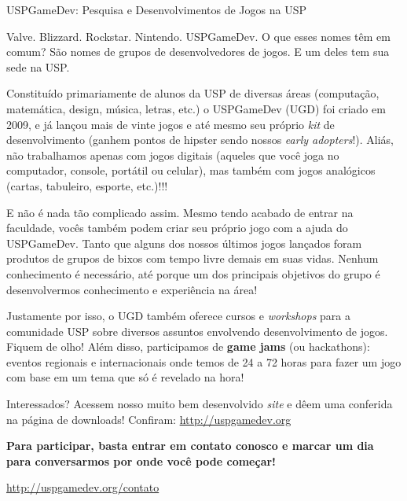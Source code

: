 \begin{subsecao}{USPGameDev: Pesquisa e Desenvolvimentos de Jogos na USP}


Valve. Blizzard. Rockstar. Nintendo. USPGameDev. O que esses nomes têm em comum?
São nomes de grupos de desenvolvedores de jogos. E um deles tem sua sede na USP.

Constituído primariamente de alunos da USP de diversas áreas (computação,
matemática, design, música, letras, etc.) o USPGameDev (UGD) foi criado em 2009,
e já lançou mais de vinte jogos e até mesmo seu próprio \textit{kit} de
desenvolvimento (ganhem pontos de hipster sendo nossos
\textit{early adopters}!). Aliás, não trabalhamos apenas com jogos digitais
(aqueles que você joga no computador, console, portátil ou celular), mas também
com jogos analógicos (cartas, tabuleiro, esporte, etc.)!!!

E não é nada tão complicado assim. Mesmo tendo acabado de entrar na faculdade,
vocês também podem criar seu próprio jogo com a ajuda do USPGameDev. Tanto que
alguns dos nossos últimos jogos lançados foram produtos de grupos de bixos com
tempo livre demais em suas vidas. Nenhum conhecimento é necessário, até porque
um dos principais objetivos do grupo é desenvolvermos conhecimento e experiência
na área!

Justamente por isso, o UGD também oferece cursos e \textit{workshops} para a
comunidade USP sobre diversos assuntos envolvendo desenvolvimento de jogos.
Fiquem de olho! Além disso, participamos de \textbf{game jams} (ou hackathons):
eventos regionais e internacionais onde temos de 24 a 72 horas para fazer um
jogo com base em um tema que só é revelado na hora!

Interessados? Acessem nosso muito bem desenvolvido \textit{site} e dêem uma
conferida na página de downloads! Confiram: \url{http://uspgamedev.org}

\textbf{Para participar, basta entrar em contato conosco e marcar um dia para
conversarmos por onde você pode começar!}

\begin{center}
  \Large
  \url{http://uspgamedev.org/contato}
\end{center}

\end{subsecao}
